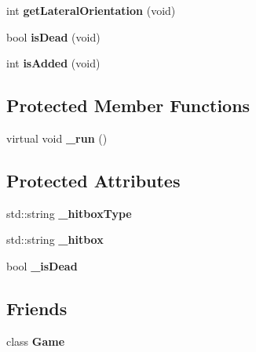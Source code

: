 \begin{DoxyCompactItemize}
\item 
\hypertarget{class_elements_add4340c523571631da317d8a64fc1368}{int {\bfseries get\+Lateral\+Orientation} (void)}\label{class_elements_add4340c523571631da317d8a64fc1368}

\item 
\hypertarget{class_elements_a21476dd839923a41aa28c7c75273d562}{bool {\bfseries is\+Dead} (void)}\label{class_elements_a21476dd839923a41aa28c7c75273d562}

\item 
\hypertarget{class_elements_ad285c1b54452609bcf2343ba1f8dea41}{int {\bfseries is\+Added} (void)}\label{class_elements_ad285c1b54452609bcf2343ba1f8dea41}

\end{DoxyCompactItemize}
\subsection*{Protected Member Functions}
\begin{DoxyCompactItemize}
\item 
\hypertarget{class_elements_aa367c1471a9fc7f1a9b7b124e69c3ef3}{virtual void {\bfseries \+\_\+run} ()}\label{class_elements_aa367c1471a9fc7f1a9b7b124e69c3ef3}

\end{DoxyCompactItemize}
\subsection*{Protected Attributes}
\begin{DoxyCompactItemize}
\item 
\hypertarget{class_elements_a8968fcb76f2c8473b2715415ddc2d8be}{std\+::string {\bfseries \+\_\+hitbox\+Type}}\label{class_elements_a8968fcb76f2c8473b2715415ddc2d8be}

\item 
\hypertarget{class_elements_a7e38d955602d5ea837411a6ffcb0d2cd}{std\+::string {\bfseries \+\_\+hitbox}}\label{class_elements_a7e38d955602d5ea837411a6ffcb0d2cd}

\item 
\hypertarget{class_elements_a5eb994bf668a142382beaa6791920d9f}{bool {\bfseries \+\_\+is\+Dead}}\label{class_elements_a5eb994bf668a142382beaa6791920d9f}

\end{DoxyCompactItemize}
\subsection*{Friends}
\begin{DoxyCompactItemize}
\item 
\hypertarget{class_elements_aa2fab026580d6f14280c2ffb8063a314}{class {\bfseries Game}}\label{class_elements_aa2fab026580d6f14280c2ffb8063a314}

\end{DoxyCompactItemize}


